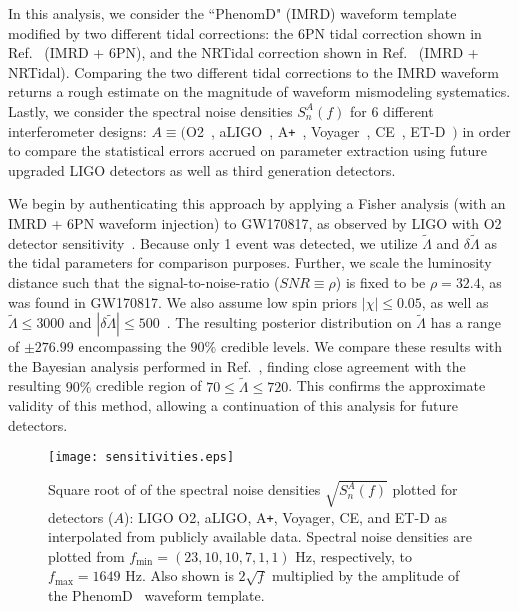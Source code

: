 \documentclass[prd,twocolumn,nofootinbib,superscriptaddress,amsmath,amssymb]{revtex4-1}
\begin{document}
In this analysis, we consider the ``PhenomD" (IMRD) waveform template~\cite{PhenomDI,PhenomDII} modified by two different tidal corrections: the 6PN tidal correction shown in Ref.~\cite{Wade:tidalCorrections} (IMRD + 6PN), and the NRTidal correction shown in Ref.~\cite{Samajdar:NRTidal} (IMRD + NRTidal).
Comparing the two different tidal corrections to the IMRD waveform returns a rough estimate on the magnitude of waveform mismodeling systematics.
Lastly, we consider the spectral noise densities $S_n^A(f)$ for 6 different interferometer designs: $A \equiv ($O2~\cite{aLIGO}, aLIGO~\cite{aLIGO}, A\texttt{+}~\cite{Ap_Voyager_CE}, Voyager~\cite{Ap_Voyager_CE}, CE~\cite{ET}, ET-D~\cite{Ap_Voyager_CE}$)$ in order to compare the statistical errors accrued on parameter extraction using future upgraded LIGO detectors as well as third generation detectors.

We begin by authenticating this approach by applying a Fisher analysis (with an IMRD + 6PN waveform injection) to GW170817, as observed by LIGO with O2 detector sensitivity~\cite{aLIGO}.
Because only 1 event was detected, we utilize $\tilde\Lambda$ and $\delta\tilde\Lambda$ as the tidal parameters for comparison purposes.
Further, we scale the luminosity distance such that the signal-to-noise-ratio ($SNR \equiv \rho$) is fixed to be $\rho=32.4$, as was found in GW170817.
We also assume low spin priors $|\chi| \leq 0.05$, as well as $\tilde{\Lambda} \leq 3000$ and $|\delta \tilde{\Lambda}| \leq 500$~\cite{Wade:LambdaPriors}.
The resulting posterior distribution on $\tilde{\Lambda}$ has a range of $\pm 276.99$ encompassing the $90\%$ credible levels.
We compare these results with the Bayesian analysis performed in Ref.~\cite{TheLIGOScientific:2017qsa,Abbott2018}, finding close agreement with the resulting $90\%$ credible region of $70 \leq \tilde{\Lambda} \leq 720$.
This confirms the approximate validity of this method, allowing a continuation of this analysis for future detectors.
\begin{figure}
\begin{center} 
\texttt{[image: sensitivities.eps]}
\end{center}
\caption{
Square root of of the spectral noise densities $\sqrt{S_n^A(f)}$ plotted for detectors ($A$): LIGO O2, aLIGO, A\texttt{+}, Voyager, CE, and ET-D as interpolated from publicly available data.
Spectral noise densities are plotted from $f_{\text{min}}=(23,10,10,7,1,1) \text{ Hz}$, respectively, to $f_{\text{max}}=1649 \text{ Hz}$.
Also shown is $2 \sqrt{f}$ multiplied by the amplitude of the PhenomD~\cite{PhenomDI,PhenomDII} waveform template.
}
\label{fig:sensitivities}
\end{figure}
\end{document}
